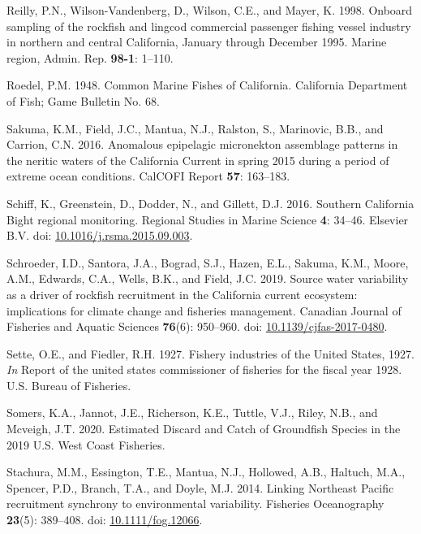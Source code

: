 \documentclass[
  english,
  a4paper,
]{article}
\newlength{\cslhangindent}
\newlength{\cslentryspacingunit} %
\newenvironment{CSLReferences}[2] %
 {%
  \setlength{\parindent}{0pt}
  \ifodd #1
  \let\oldpar\par
  \def\par{\hangindent=\cslhangindent\oldpar}
  \fi
  \setlength{\parskip}{#2\cslentryspacingunit}
 }%
 {}
\begin{document}
\begin{CSLReferences}{1}{0}
\leavevmode{}%
Reilly, P.N., Wilson-Vandenberg, D., Wilson, C.E., and Mayer, K. 1998. {Onboard sampling of the rockfish and lingcod commercial passenger fishing vessel industry in northern and central California, January through December 1995.} Marine region, Admin. Rep. \textbf{98-1}: 1--110.

\leavevmode{}%
Roedel, P.M. 1948. {Common Marine Fishes of California}. California Department of Fish; Game Bulletin No. 68.

\leavevmode{}%
Sakuma, K.M., Field, J.C., Mantua, N.J., Ralston, S., Marinovic, B.B., and Carrion, C.N. 2016. {Anomalous epipelagic micronekton assemblage patterns in the neritic waters of the California Current in spring 2015 during a period of extreme ocean conditions}. CalCOFI Report \textbf{57}: 163--183.

\leavevmode{}%
Schiff, K., Greenstein, D., Dodder, N., and Gillett, D.J. 2016. {Southern California Bight regional monitoring}. Regional Studies in Marine Science \textbf{4}: 34--46. Elsevier B.V. doi: \href{https://doi.org/10.1016/j.rsma.2015.09.003}{10.1016/j.rsma.2015.09.003}.

\leavevmode{}%
Schroeder, I.D., Santora, J.A., Bograd, S.J., Hazen, E.L., Sakuma, K.M., Moore, A.M., Edwards, C.A., Wells, B.K., and Field, J.C. 2019. {Source water variability as a driver of rockfish recruitment in the California current ecosystem: implications for climate change and fisheries management}. Canadian Journal of Fisheries and Aquatic Sciences \textbf{76}(6): 950--960. doi: \href{https://doi.org/10.1139/cjfas-2017-0480}{10.1139/cjfas-2017-0480}.

\leavevmode{}%
Sette, O.E., and Fiedler, R.H. 1927. {Fishery industries of the United States, 1927}. \emph{In} Report of the united states commissioner of fisheries for the fiscal year 1928. U.S. Bureau of Fisheries.

\leavevmode{}%
Somers, K.A., Jannot, J.E., Richerson, K.E., Tuttle, V.J., Riley, N.B., and Mcveigh, J.T. 2020. {Estimated Discard and Catch of Groundfish Species in the 2019 U.S. West Coast Fisheries}.

\leavevmode{}%
Stachura, M.M., Essington, T.E., Mantua, N.J., Hollowed, A.B., Haltuch, M.A., Spencer, P.D., Branch, T.A., and Doyle, M.J. 2014. {Linking Northeast Pacific recruitment synchrony to environmental variability}. Fisheries Oceanography \textbf{23}(5): 389--408. doi: \href{https://doi.org/10.1111/fog.12066}{10.1111/fog.12066}.


\end{CSLReferences}
\end{document}
